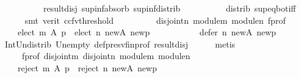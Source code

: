 \begin{isabellebody}
\ \ \ \ \ \ \ \ \ \ result{\isacharunderscore}{\kern0pt}disj\ sup{\isacharunderscore}{\kern0pt}inf{\isacharunderscore}{\kern0pt}absorb\ sup{\isacharunderscore}{\kern0pt}inf{\isacharunderscore}{\kern0pt}distrib{}\isanewline
\ \ \ \ \ \ \ \ \ \ distrib{\isacharparenleft}{\kern0pt}{}{\isacharparenright}{\kern0pt}\ sup{\isacharunderscore}{\kern0pt}eq{\isacharunderscore}{\kern0pt}bot{\isacharunderscore}{\kern0pt}iff\isanewline
\ \ \ \ \isamarkupfalse%
\ {\isacharparenleft}{\kern0pt}smt\ {\isacharparenleft}{\kern0pt}verit{\isacharcomma}{\kern0pt}\ ccfv{\isacharunderscore}{\kern0pt}threshold{\isacharparenright}{\kern0pt}{\isacharparenright}{\kern0pt}\isanewline
\ \ \isamarkupfalse%
\ \isamarkupfalse%
\ {}\ {}\ {}\ {}\ disjoint{\isacharunderscore}{\kern0pt}n\ module{\isacharunderscore}{\kern0pt}m\ module{\isacharunderscore}{\kern0pt}n\ f{\isacharunderscore}{\kern0pt}prof\ \isamarkupfalse%
\isanewline
\ \ \ \ {\isachardoublequoteopen}{\isacharparenleft}{\kern0pt}elect\ m\ A\ p\ {\isasymunion}\ elect\ n\ {\isacharquery}{\kern0pt}new{\isacharunderscore}{\kern0pt}A\ {\isacharquery}{\kern0pt}new{\isacharunderscore}{\kern0pt}p{\isacharparenright}{\kern0pt}\ {\isasyminter}\isanewline
\ \ \ \ \ \ \ \ \ \ {\isacharparenleft}{\kern0pt}defer\ n\ {\isacharquery}{\kern0pt}new{\isacharunderscore}{\kern0pt}A\ {\isacharquery}{\kern0pt}new{\isacharunderscore}{\kern0pt}p{\isacharparenright}{\kern0pt}\ {\isacharequal}{\kern0pt}\ {\isacharbraceleft}{\kern0pt}{\isacharbraceright}{\kern0pt}{\isachardoublequoteclose}\isanewline
\ \ \ \ \isamarkupfalse%
\ Int{\isacharunderscore}{\kern0pt}Un{\isacharunderscore}{\kern0pt}distrib{}\ Un{\isacharunderscore}{\kern0pt}empty\ def{\isacharunderscore}{\kern0pt}presv{\isacharunderscore}{\kern0pt}fin{\isacharunderscore}{\kern0pt}prof\ result{\isacharunderscore}{\kern0pt}disj\isanewline
\ \ \ \ \isamarkupfalse%
\ metis\isanewline
\ \ \isamarkupfalse%
\ \isamarkupfalse%
\ {}\ {}\ {}\ {}\ f{\isacharunderscore}{\kern0pt}prof\ disjoint{\isacharunderscore}{\kern0pt}m\ disjoint{\isacharunderscore}{\kern0pt}n\ module{\isacharunderscore}{\kern0pt}m\ module{\isacharunderscore}{\kern0pt}n\isanewline
\ \ \isamarkupfalse%
\isanewline
\ \ \ \ {\isachardoublequoteopen}{\isacharparenleft}{\kern0pt}reject\ m\ A\ p\ {\isasymunion}\ reject\ n\ {\isacharquery}{\kern0pt}new{\isacharunderscore}{\kern0pt}A\ {\isacharquery}{\kern0pt}new{\isacharunderscore}{\kern0pt}p{\isacharparenright}{\kern0pt}\ {\isasyminter}\isanewline

\end{isabellebody}
